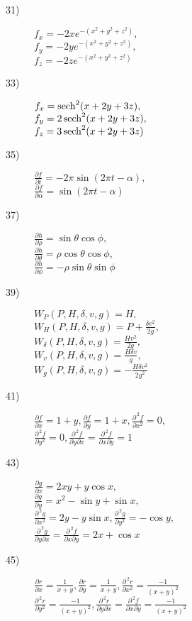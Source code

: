 \begin {description}
\item [
31)
]
 $f_x=-2xe^{-(x^2+y^2+z^2)},$\\ $f_y=-2ye^{-(x^2+y^2+z^2)},$\\ $f_z=-2ze^{-(x^2+y^2+z^2)}$ 
\item [
33)
]
 $f_x=\operatorname{sech} ^2(x+2y+3z),$\\ $f_y=2\operatorname{sech} ^2(x+2y+3z),$\\ $f_z=3\operatorname{sech} ^2(x+2y+3z)$ 
\item [
35)
]
 $\tfrac {\partial f}{\partial t}=-2\pi \sin (2\pi t-\alpha ),$\\ $\tfrac {\partial f}{\partial \alpha }=\sin (2\pi t-\alpha )$ 
\item [
37)
]
 $\tfrac {\partial h}{\partial \rho }=\sin \theta \cos \phi ,$\\ $\tfrac {\partial h}{\partial \theta }=\rho \cos \theta \cos \phi ,$\\ $\frac {\partial h}{\partial \phi }=-\rho \sin \theta \sin \phi $ 
\item [
39)
]
 $W_P(P,H,\delta ,v,g)=H,$\\ $W_H(P,H,\delta ,v,g)=P+\tfrac {\delta v^2}{2g},$\\ $W_{\delta }(P,H,\delta ,v,g)=\tfrac {Hv^2}{2g},$\\ $W_v(P,H,\delta ,v,g)=\tfrac {H\delta v}{g},$\\ $W_g(P,H,\delta ,v,g)=-\tfrac {H\delta v^2}{2g^2}$ 
\item [
41)
]
 $\tfrac {\partial f}{\partial x}=1+y, \tfrac {\partial f}{\partial y}=1+x,\frac {\partial ^{\,2} f}{\partial x^2}=0,$\\ $\frac {\partial ^{\,2} f}{\partial y^2}=0,\frac {\partial ^{\,2} f}{\partial y\partial x}=\frac {\partial ^{\,2} f}{\partial x\partial y}=1$ 
\item [
43)
]
 $\tfrac {\partial g}{\partial x}=2xy+y\cos x,$\\ $\tfrac {\partial g}{\partial y}=x^2-\sin y+\sin x,$\\ $\frac {\partial ^{\,2} g}{\partial x^2}=2y-y\sin x,\frac {\partial ^{\,2} g}{\partial y^2}=-\cos y,$\\ $\frac {\partial ^{\,2} g}{\partial y\partial x}=\frac {\partial ^{\,2} f}{\partial x\partial y}=2x+\cos x$ 
\item [
45)
]
 $\tfrac {\partial r}{\partial x}=\tfrac {1}{x+y},\tfrac {\partial r}{\partial y}=\tfrac {1}{x+y},\frac {\partial ^{\,2} r}{\partial x^2}=\tfrac {-1}{(x+y)^2}$\\ $\frac {\partial ^{\,2} r}{\partial y^2}=\tfrac {-1}{(x+y)^2},\frac {\partial ^{\,2} r}{\partial y\partial x}=\frac {\partial ^{\,2} f}{\partial x\partial y}=\tfrac {-1}{(x+y)^2}$ 

\end{description}

